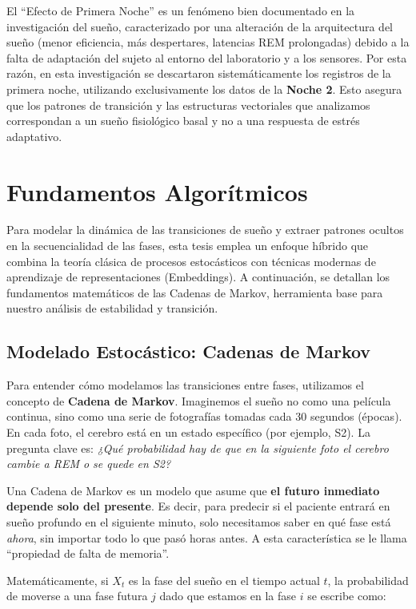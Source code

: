 El ``Efecto de Primera Noche'' es un fenómeno bien documentado en la investigación del sueño, caracterizado por una alteración de la arquitectura del sueño (menor eficiencia, más despertares, latencias REM prolongadas) debido a la falta de adaptación del sujeto al entorno del laboratorio y a los sensores. Por esta razón, en esta investigación se descartaron sistemáticamente los registros de la primera noche, utilizando exclusivamente los datos de la \textbf{Noche 2}. Esto asegura que los patrones de transición y las estructuras vectoriales que analizamos correspondan a un sueño fisiológico basal y no a una respuesta de estrés adaptativo.

\section{Fundamentos Algorítmicos}

Para modelar la dinámica de las transiciones de sueño y extraer patrones ocultos en la secuencialidad de las fases, esta tesis emplea un enfoque híbrido que combina la teoría clásica de procesos estocásticos con técnicas modernas de aprendizaje de representaciones (Embeddings). A continuación, se detallan los fundamentos matemáticos de las Cadenas de Markov, herramienta base para nuestro análisis de estabilidad y transición.

\subsection{Modelado Estocástico: Cadenas de Markov}

Para entender cómo modelamos las transiciones entre fases, utilizamos el concepto de \textbf{Cadena de Markov}. Imaginemos el sueño no como una película continua, sino como una serie de fotografías tomadas cada 30 segundos (épocas). En cada foto, el cerebro está en un estado específico (por ejemplo, S2). La pregunta clave es: \textit{¿Qué probabilidad hay de que en la siguiente foto el cerebro cambie a REM o se quede en S2?}

Una Cadena de Markov es un modelo que asume que \textbf{el futuro inmediato depende solo del presente}. Es decir, para predecir si el paciente entrará en sueño profundo en el siguiente minuto, solo necesitamos saber en qué fase está \textit{ahora}, sin importar todo lo que pasó horas antes. A esta característica se le llama ``propiedad de falta de memoria''.

Matemáticamente, si $X_t$ es la fase del sueño en el tiempo actual $t$, la probabilidad de moverse a una fase futura $j$ dado que estamos en la fase $i$ se escribe como:


